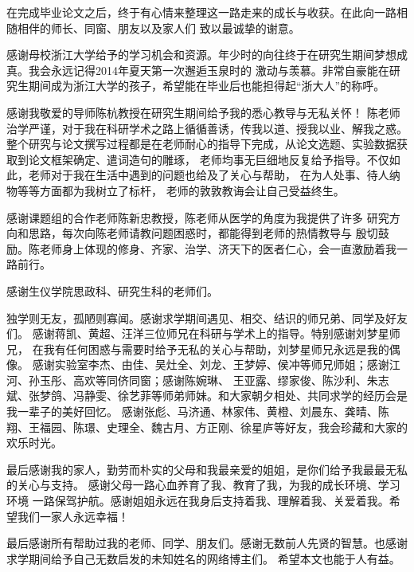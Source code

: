 \cleardoublepage
{}

在完成毕业论文之后，终于有心情来整理这一路走来的成长与收获。在此向一路相随相伴的师长、同窗、朋友以及家人们
致以最诚挚的谢意。

感谢母校浙江大学给予的学习机会和资源。年少时的向往终于在研究生期间梦想成真。我会永远记得2014年夏天第一次邂逅玉泉时的
激动与羡慕。非常自豪能在研究生期间成为浙江大学的孩子，希望能在毕业后也能担得起“浙大人”的称呼。

感谢我敬爱的导师陈杭教授在研究生期间给予我的悉心教导与无私关怀！
陈老师治学严谨，对于我在科研学术之路上循循善诱，传我以道、授我以业、解我之惑。
整个研究与论文撰写过程都是在老师耐心的指导下完成，从论文选题、实验数据获取到论文框架确定、遣词造句的雕琢，
老师均事无巨细地反复给予指导。不仅如此，老师对于我在生活中遇到的问题也给及了关心与帮助，
在为人处事、待人纳物等等方面都为我树立了标杆，
老师的敦敦教诲会让自己受益终生。

感谢课题组的合作老师陈新忠教授，陈老师从医学的角度为我提供了许多
研究方向和思路，每次向陈老师请教问题困惑时，都能得到老师的热情教导与
殷切鼓励。陈老师身上体现的修身、齐家、治学、济天下的医者仁心，会一直激励着我一路前行。

感谢生仪学院思政科、研究生科的老师们。

独学则无友，孤陋则寡闻。感谢求学期间遇见、相交、结识的师兄弟、同学及好友们。
感谢蒋凯、黄超、汪洋三位师兄在科研与学术上的指导。特别感谢刘梦星师兄，
在我有任何困惑与需要时给予无私的关心与帮助，刘梦星师兄永远是我的偶像。
感谢实验室李杰、由佳、吴灶全、刘龙、王梦婷、侯冲等师兄师姐；感谢江河、孙玉彤、高欢等同侪同窗；感谢陈婉琳、
王亚露、缪家俊、陈沙利、朱志斌、张梦鸽、冯静雯、徐艺菲等师弟师妹。和大家朝夕相处、共同求学的经历会是我一辈子的美好回忆。
感谢张彪、马济通、林家伟、黄橙、刘晨东、龚晴、陈翔、王福园、陈璟、史理全、魏古月、方正刚、徐星庐等好友，我会珍藏和大家的欢乐时光。


最后感谢我的家人，勤劳而朴实的父母和我最亲爱的姐姐，是你们给予我最最无私的关心与支持。
感谢父母一路心血养育了我、教育了我，为我的成长环境、学习环境
一路保驾护航。感谢姐姐永远在我身后支持着我、理解着我、关爱着我。希望我们一家人永远幸福！

最后感谢所有帮助过我的老师、同学、朋友们。感谢无数前人先贤的智慧。也感谢求学期间给予自己无数启发的未知姓名的网络博主们。
希望本文也能于人有益。


